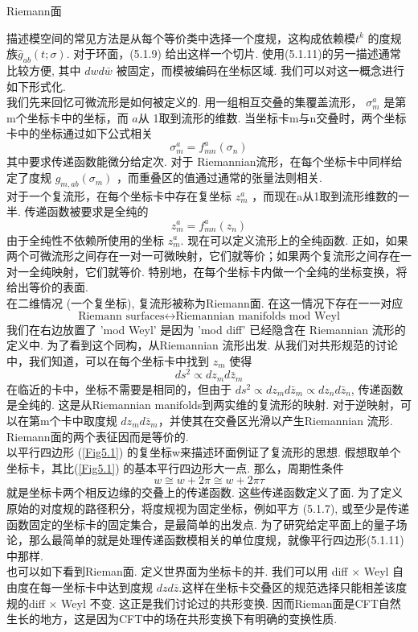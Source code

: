 \centerline{\Large Riemann面}
描述模空间的常见方法是从每个等价类中选择一个度规，这构成依赖模$t^{k} $ 的度规族$\hat{g}_{a b}(t ; \sigma)$. 对于环面，(5.1.9) 给出这样一个切片. 使用(5.1.11)的另一描述通常比较方便, 其中 $d w d \bar{w}$ 被固定，而模被编码在坐标区域. 我们可以对这一概念进行如下形式化.\\
我们先来回忆可微流形是如何被定义的. 用一组相互交叠的集覆盖流形， $\sigma_{m}^{a}$ 是第 m个坐标卡中的坐标，而 $a$从 1取到流形的维数. 当坐标卡m与n交叠时，两个坐标卡中的坐标通过如下公式相关
\begin{equation}
	\sigma_{m}^{a}=f_{m n}^{a}\left(\sigma_{n}\right)
\end{equation}
其中要求传递函数能微分给定次. 对于 Riemannian流形，在每个坐标卡中同样给定了度规 $g_{m, a b}\left(\sigma_{m}\right)$ ，而重叠区的值通过通常的张量法则相关.\\
对于一个复流形，在每个坐标卡中存在复坐标 $z_{m}^{a}$ ，而现在a从1取到流形维数的一半. 传递函数被要求是全纯的
\begin{equation}
	z_{m}^{a}=f_{m n}^{a}\left(z_{n}\right)
\end{equation}
由于全纯性不依赖所使用的坐标 $z_{m}^{a}$. 现在可以定义流形上的全纯函数. 正如，如果两个可微流形之间存在一对一可微映射，它们就等价；如果两个复流形之间存在一对一全纯映射，它们就等价. 特别地，在每个坐标卡内做一个全纯的坐标变换，将给出等价的表面.\\
在二维情况 (一个复坐标), 复流形被称为Riemann面. 在这一情况下存在一一对应
\begin{equation}
\text{Riemann surfaces} \leftrightarrow \text{Riemannian manifolds mod Weyl}
\end{equation}
我们在右边放置了 'mod Weyl' 是因为 'mod diff' 已经隐含在 Riemannian 流形的定义中. 为了看到这个同构，从Riemannian 流形出发. 从我们对共形规范的讨论中，我们知道，可以在每个坐标卡中找到 $z_{m}$ 使得
\begin{equation}
	d s^{2} \propto d z_{m} d \bar{z}_{m}
\end{equation}
在临近的卡中，坐标不需要是相同的，但由于 $d s^{2} \propto d z_{m} d \bar{z}_{m} \propto d z_{n} d \bar{z}_{n}$, 传递函数是全纯的. 这是从Riemannian manifolds到两实维的复流形的映射. 对于逆映射，可以在第m个卡中取度规 $d z_{m} d \bar{z}_{m}$，并使其在交叠区光滑以产生Riemannian 流形. Riemann面的两个表征因而是等价的.\\
以平行四边形 (\ref{Fig5.1}) 的复坐标w来描述环面例证了复流形的思想. 假想取单个坐标卡，其比(\ref{Fig5.1}) 的基本平行四边形大一点. 那么，周期性条件
\begin{equation}
	w \cong w+2 \pi \cong w+2 \pi \tau
\end{equation}
就是坐标卡两个相反边缘的交叠上的传递函数. 这些传递函数定义了面. 为了定义原始的对度规的路径积分，将度规视为固定坐标，例如平方 (5.1.7), 或至少是传递函数固定的坐标卡的固定集合，是最简单的出发点. 为了研究给定平面上的量子场论，那么最简单的就是处理传递函数模相关的单位度规，就像平行四边形(5.1.11)中那样.\\
也可以如下看到Rieman面. 定义世界面为坐标卡的并. 我们可以用 diff $\times$ Weyl 自由度在每一坐标卡中达到度规 $d z d \bar{z}$.这样在坐标卡交叠区的规范选择只能相差该度规的diff $\times$ Weyl 不变. 这正是我们讨论过的共形变换. 因而Rieman面是CFT自然生长的地方，这是因为CFT中的场在共形变换下有明确的变换性质.

